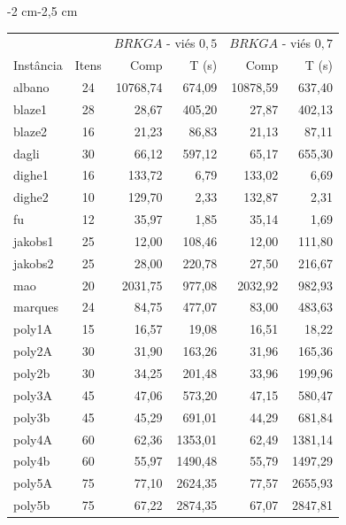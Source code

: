 \documentclass{article}
\newcommand{\lgray}{\cellcolor{lightgray}}
\begin{document}
\begin{adjustwidth}{-2 cm}{-2,5 cm}\centering\begin{threeparttable}[!htb]
\renewcommand{\arraystretch}{1.2}%
    \caption{Resultados obtidos pelas duas variações da meta-heurística $BRKGA$, com viés de $0,5$ e $0,7$.}
    \scriptsize{
        \begin{tabular}{|l|c|rr|rr|}\hline
        \multicolumn{1}{|c|}{} & \multicolumn{1}{c|}{} &  \multicolumn{2}{c|}{$BRKGA$ - viés $0,5$} & \multicolumn{2}{c|}{$BRKGA$ - viés $0,7$}\\
        Instância &Itens &Comp &T (s) &Comp &T (s) \\\hline
        albano &24 &\lgray10768,74 &674,09 &10878,59 &637,40 \\
        blaze1 &28 &28,67 &405,20 &\lgray27,87 &402,13 \\
        blaze2 &16 &21,23 &86,83 &\lgray21,13 &87,11 \\
        dagli &30 &66,12 &597,12 &\lgray65,17 &655,30 \\
        dighe1 &16 &133,72 &6,79 &\lgray133,02 &6,69 \\
        dighe2 &10 &\lgray129,70 &2,33 &132,87 &2,31 \\
        fu &12 &35,97 &1,85 &\lgray35,14 &1,69 \\
        jakobs1 &25 &\lgray12,00 &108,46 &\lgray12,00 &111,80 \\
        jakobs2 &25 &28,00 &220,78 &\lgray27,50 &216,67 \\
        mao &20 &\lgray2031,75 &977,08 &2032,92 &982,93 \\
        marques &24 &84,75 &477,07 &\lgray83,00 &483,63 \\
        poly1A &15 &16,57 &19,08 &\lgray16,51 &18,22 \\
        poly2A &30 &\lgray31,90 &163,26 &31,96 &165,36 \\
        poly2b &30 &34,25 &201,48 &\lgray33,96 &199,96 \\
        poly3A &45 &\lgray47,06 &573,20 &47,15 &580,47 \\
        poly3b &45 &45,29 &691,01 &\lgray44,29 &681,84 \\
        poly4A &60 &\lgray62,36 &1353,01 &62,49 &1381,14 \\
        poly4b &60 &55,97 &1490,48 &\lgray55,79 &1497,29 \\
        poly5A &75 &\lgray77,10 &2624,35 &77,57 &2655,93 \\
        poly5b &75 &67,22 &2874,35 &\lgray67,07 &2847,81 \\

\end{tabular}}
\end{threeparttable}
\end{adjustwidth}
\end{document}
